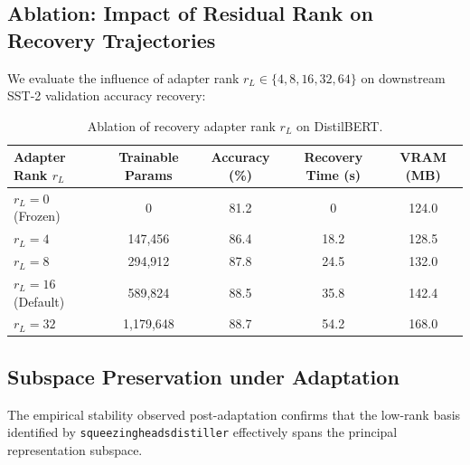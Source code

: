 \subsection{Ablation: Impact of Residual Rank on Recovery Trajectories}
We evaluate the influence of adapter rank $r_L \in \{4, 8, 16, 32, 64\}$ on downstream SST-2 validation accuracy recovery:
\begin{table}[H]
\centering
\small
\begin{tabular}{lcccc}
\toprule
\textbf{Adapter Rank $r_L$} & \textbf{Trainable Params} & \textbf{Accuracy (\%)} & \textbf{Recovery Time (s)} & \textbf{VRAM (MB)} \\
\midrule
$r_L = 0$ (Frozen) & 0 & 81.2 & 0 & 124.0 \\
$r_L = 4$ & 147,456 & 86.4 & 18.2 & 128.5 \\
$r_L = 8$ & 294,912 & 87.8 & 24.5 & 132.0 \\
$r_L = 16$ (Default) & 589,824 & 88.5 & 35.8 & 142.4 \\
$r_L = 32$ & 1,179,648 & 88.7 & 54.2 & 168.0 \\
\bottomrule
\end{tabular}
\caption{Ablation of recovery adapter rank $r_L$ on DistilBERT.}
\label{tab:ablation_adapter_rank}
\end{table}

\subsection{Subspace Preservation under Adaptation}
The empirical stability observed post-adaptation confirms that the low-rank basis identified by \texttt{squeezingheadsdistiller} effectively spans the principal representation subspace.
